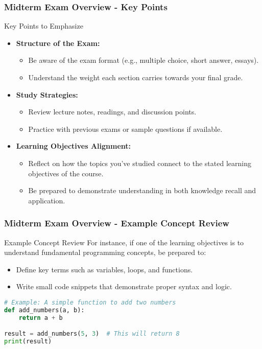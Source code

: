 \documentclass[aspectratio=169]{beamer}
\begin{document}
\begin{frame}[fragile]
    \frametitle{Midterm Exam Overview - Key Points}
    \begin{block}{Key Points to Emphasize}
        \begin{itemize}
            \item \textbf{Structure of the Exam:}
            \begin{itemize}
                \item Be aware of the exam format (e.g., multiple choice, short answer, essays).
                \item Understand the weight each section carries towards your final grade.
            \end{itemize}
            
            \item \textbf{Study Strategies:}
            \begin{itemize}
                \item Review lecture notes, readings, and discussion points.
                \item Practice with previous exams or sample questions if available.
            \end{itemize}
            
            \item \textbf{Learning Objectives Alignment:}
            \begin{itemize}
                \item Reflect on how the topics you’ve studied connect to the stated learning objectives of the course.
                \item Be prepared to demonstrate understanding in both knowledge recall and application.
            \end{itemize}
        \end{itemize}
    \end{block}
\end{frame}

\begin{frame}[fragile]
    \frametitle{Midterm Exam Overview - Example Concept Review}
    \begin{block}{Example Concept Review}
        For instance, if one of the learning objectives is to understand fundamental programming concepts, be prepared to:
        \begin{itemize}
            \item Define key terms such as variables, loops, and functions.
            \item Write small code snippets that demonstrate proper syntax and logic.
        \end{itemize}
    \end{block}

    \begin{lstlisting}[language=Python]
# Example: A simple function to add two numbers
def add_numbers(a, b):
    return a + b

result = add_numbers(5, 3)  # This will return 8
print(result)
    \end{lstlisting}
\end{frame}
\end{document}

